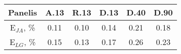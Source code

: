 \begin{tabular}{ | c | c c c c c | }\hline
Panelis	&A.13	&R.13	&D.13	&D.40	&D.90\\ \hline
E$_{JA}$, \%		&0.11	&0.10	&0.14	&0.21	&0.18\\ \hline
E$_{LG}$, \%		&0.15	&0.13	&0.17	&0.26	&0.23\\ \hline
\end{tabular}